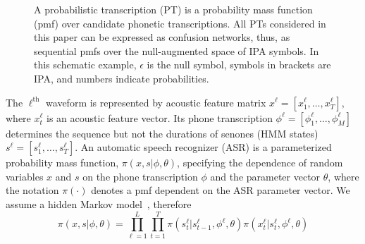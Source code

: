 \begin{figure}
\begin{center}
\end{center}
\caption{A probabilistic transcription (PT) is a probability mass
    function (pmf) over candidate phonetic transcriptions.  All PTs
    considered in this paper can be expressed as confusion networks,
    thus, as sequential pmfs over the null-augmented space of IPA
    symbols.  In this schematic example, $\epsilon$ is the null
    symbol, symbols in brackets are IPA, and numbers indicate
    probabilities.}
  \label{fig:pt}
\end{figure}

The $\ell^{\textrm{th}}$ waveform is represented by acoustic feature
matrix $x^\ell =[x_1^\ell,\ldots,x_T^\ell]$, where $x_t^\ell$ is an
acoustic feature vector.  Its phone transcription
$\phi^\ell=[\phi_1^\ell,\ldots,\phi_M^\ell]$ determines the sequence
but not the durations of senones (HMM states) $s^\ell
=[s_1^\ell,\ldots,s_T^\ell]$.  An automatic speech recognizer (ASR) is
a parameterized probability mass function, $\pi(x,s|\phi,\theta)$,
specifying the dependence of random variables $x$ and $s$ on the phone
transcription $\phi$ and the parameter vector $\theta$, where the
notation $\pi(\cdot)$ denotes a pmf dependent on the ASR parameter
vector.  We assume a hidden Markov model~\cite{Baker75}, therefore
\[
\pi(x,s|\phi,\theta)=\prod_{\ell=1}^L \prod_{t=1}^T
\pi(s_t^\ell|s_{t-1}^\ell,\phi^\ell,\theta)\pi(x_t^\ell|s_t^\ell,\phi^\ell,\theta)
\]
